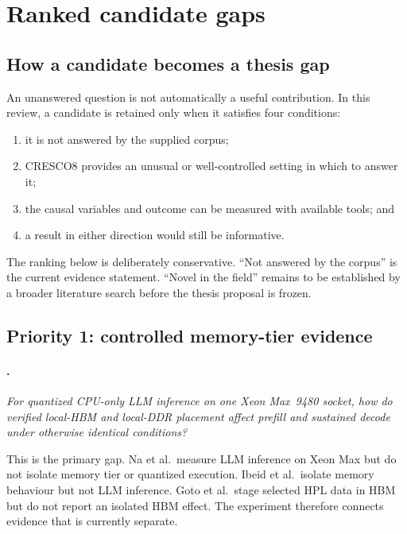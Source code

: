 \section{Ranked candidate gaps}
\label{sec:gaps}

\subsection{How a candidate becomes a thesis gap}

An unanswered question is not automatically a useful contribution.  In
this review, a candidate is retained only when it satisfies four
conditions:

\begin{enumerate}
  \item it is not answered by the supplied corpus;
  \item CRESCO8 provides an unusual or well-controlled setting in which
        to answer it;
  \item the causal variables and outcome can be measured with available
        tools; and
  \item a result in either direction would still be informative.
\end{enumerate}

The ranking below is deliberately conservative.  ``Not answered by the
corpus'' is the current evidence statement.  ``Novel in the field''
remains to be established by a broader literature search before the
thesis proposal is frozen.

\subsection{Priority 1: controlled memory-tier evidence}
\label{sec:gap-primary}

\paragraph{.}
\emph{For quantized CPU-only LLM inference on one Xeon Max~9480 socket,
how do verified local-HBM and local-DDR placement affect prefill and
sustained decode under otherwise identical conditions?}

This is the primary gap.  Na et al.\ measure LLM inference on Xeon Max
but do not isolate memory tier or quantized \lcpp{} execution.  Ibeid et
al.\ isolate memory behaviour but not LLM inference.  Goto et al.\ stage
selected HPL data in HBM but do not report an isolated HBM effect.
The experiment therefore connects evidence that is currently separate.

